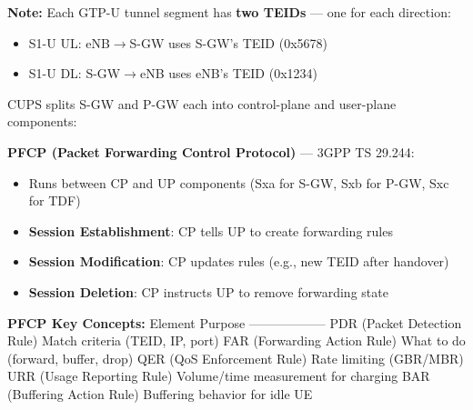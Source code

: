 




\textbf{Note:} Each GTP-U tunnel segment has \textbf{two TEIDs} — one for each direction:

\begin{itemize}
\tightlist
\item
  S1-U UL: eNB\ensuremath{\to}S-GW uses S-GW’s TEID (0x5678)
\item
  S1-U DL: S-GW\ensuremath{\to}eNB uses eNB’s TEID (0x1234)
\end{itemize}




\CNchained{}

CUPS splits S-GW and P-GW each into control-plane and user-plane components:



\textbf{PFCP (Packet Forwarding Control Protocol)} — 3GPP TS 29.244:

\begin{itemize}
\tightlist
\item
  Runs between CP and UP components (Sxa for S-GW, Sxb for P-GW, Sxc for TDF)
\item
  \textbf{Session Establishment}: CP tells UP to create forwarding rules
\item
  \textbf{Session Modification}: CP updates rules (e.g., new TEID after handover)
\item
  \textbf{Session Deletion}: CP instructs UP to remove forwarding state
\end{itemize}

\textbf{PFCP Key Concepts:}\CNbr{}\textbar{} Element \textbar{} Purpose \textbar{}\CNbr{}\textbar{}———\textbar{}———\textbar{}\CNbr{}\textbar{} PDR (Packet Detection Rule) \textbar{} Match criteria (TEID, IP, port) \textbar{}\CNbr{}\textbar{} FAR (Forwarding Action Rule) \textbar{} What to do (forward, buffer, drop) \textbar{}\CNbr{}\textbar{} QER (QoS Enforcement Rule) \textbar{} Rate limiting (GBR/\allowbreak{}MBR) \textbar{}\CNbr{}\textbar{} URR (Usage Reporting Rule) \textbar{} Volume/\allowbreak{}time measurement for charging \textbar{}\CNbr{}\textbar{} BAR (Buffering Action Rule) \textbar{} Buffering behavior for idle UE \textbar{}

